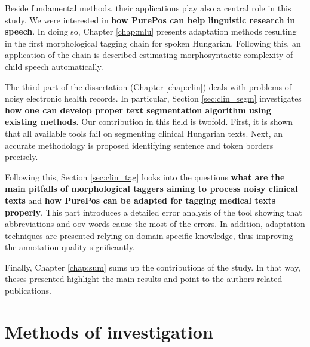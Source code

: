 Beside fundamental methods, their applications play also a central role in this study.
We were interested in \textbf{how PurePos can help linguistic research in speech}.
In doing so, Chapter \ref{chap:mlu} presents adaptation methods resulting in the first morphological tagging chain for spoken Hungarian.
Following this, an application of the chain is described estimating morphosyntactic complexity of child speech automatically.

The third part of the dissertation (Chapter \ref{chap:clin}) deals with problems of noisy electronic health records.
In particular, Section \ref{sec:clin_segm} investigates \textbf{how one can develop proper text segmentation algorithm using existing methods}. 
Our contribution in this field is twofold. 
First, it is shown that all available tools fail on segmenting clinical Hungarian texts.
Next, an accurate methodology is proposed identifying sentence and token borders precisely.

Following this, Section \ref{sec:clin_tag} looks into the questions \textbf{what are the main pitfalls of morphological taggers aiming to process noisy clinical texts} and \textbf{how PurePos can be adapted for tagging medical texts properly}.
This part introduces a detailed error analysis of the tool showing that abbreviations and \gls{oov} words cause the most of the errors.
In addition, adaptation techniques are presented relying on domain-specific knowledge, thus improving the annotation quality significantly.

Finally, Chapter \ref{chap:sum} sums up the contributions of the study. 
In that way, theses presented highlight the main results and point to the authors related publications.


\section{Methods of investigation}

